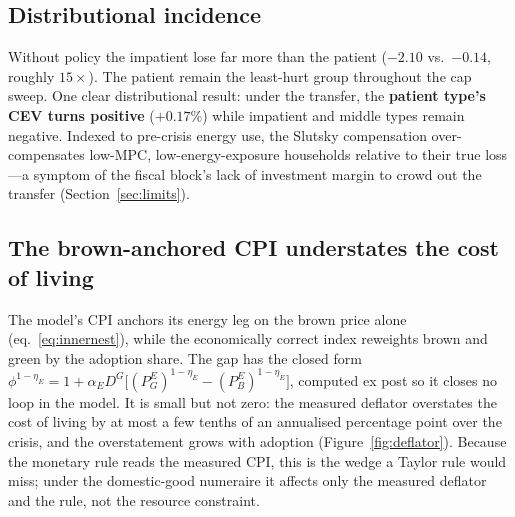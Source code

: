 \documentclass[11pt,a4paper]{article}
\begin{document}
\subsection{Distributional incidence}



Without policy the impatient lose far more than the patient ($-2.10$ vs.\
$-0.14$, roughly $15\times$). The patient remain the least-hurt group
throughout the cap sweep. One clear distributional result: under the
transfer, the \textbf{patient type's CEV turns positive} ($+0.17\%$) while
impatient and middle types remain negative. Indexed to pre-crisis energy use,
the Slutsky compensation over-compensates low-MPC, low-energy-exposure
households relative to their true loss---a symptom of the fiscal block's
lack of investment margin to crowd out the transfer (Section~\ref{sec:limits}).


\subsection{The brown-anchored CPI understates the cost of living}
\label{sec:deflator}

The model's CPI anchors its energy leg on the brown price alone
(eq.~\ref{eq:innernest}), while the economically correct index reweights brown
and green by the adoption share. The gap has the closed form
$\phi^{1-\eta_E}=1+\alpha_E D^{G}\bigl[(P^E_G)^{1-\eta_E}-(P^E_B)^{1-\eta_E}\bigr]$,
computed ex post so it closes no loop in the model. It is small but not zero:
the measured deflator overstates the cost of living by at most a few tenths of
an annualised percentage point over the crisis, and the overstatement grows
with adoption (Figure~\ref{fig:deflator}). Because the monetary rule reads the
measured CPI, this is the wedge a Taylor rule would miss; under the
domestic-good numeraire it affects only the measured deflator and the rule, not
the resource constraint.
\end{document}
